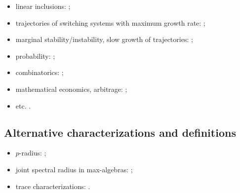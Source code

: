 \documentclass[a4paper,fleqn]{article}
\let\cite=\citep
\begin{document}
\begin{itemize}
{      Koz:INFOPROC16:e, LJP:HSCC16, LPG:SIAM20, LRG:ArXiv26,
      LRG:Automatica26, MonMarg:AJIFAC11, PEDJ:Autom16, PhilJung:ECC15,
      Prot:AJIFAC19, OgurJung:CDC14, OgurMart:LAA13, OgurMart:CDC13,
      OgurMart:ECC13, OPJ:SCL16, Reber:PhD19, ReberWebb:Nonlin20,
      SafKhan:IEEETAC17, Sheipak:MZ98, ShenHu:SIAMJCO12, SWMWK:SIAMREV07,
      Tuna:AJIFAC08, TW:CDC12, WangYu:14, WangJu:IEEECSL21, WRDV:CDC14,
      WRDV:IEEETAC16, ZhangXu:ArXiv20};
  \item linear inclusions: \cite{ABMW:MTNS12, AJPR:IFACSRCD12, Bar:AIT88-3:e,
      Bar:AIT88-2:e, Bar:AIT88-5:e, Bar:ACC95, BarVin:LAA11, CheMam:BASRM04,
      DaiOp:AIT01:e, DHHX:JFI17, GurSam:CDC05, Gurv:LAA95, VEB:LAA00,
      Wirth:IJRNC98};
  \item trajectories of switching systems with maximum growth rate:
    \cite{ACDDHK:STACS15, AGM:ArXiv24, AGMM:CDC25, BCH:SF16, GCM:CDC13,
      CGM:JDE15, GS:CDC17, HSZ:IEEETAC09, Koz:CDC05:e, Koz:Automatica22,
      Koz:WIAS05, Koz:INFOPROC06:e, LJP:HSCC16, MonMarg:AJIFAC11,
      Morris:SIAMJCO24:2, ShenHu:SIAMJCO12, WuHe:SIAMJCO20};
  \item marginal stability/instability, slow growth of trajectories:
    \cite{CMS:SCL12, Morris:SCL22, Morris:SIAMJCO24:2, MorVar:DS23,
      Sun:IEEETAC08, PhilJung:ICHS15, PJ:NAHS15, Prot:SCL16, Varney21,
      VarMor:LAA25};
  \item probability: \cite{ADFP:93, AltPar:CDC19, AltPar:SIAMJCO20,
      DHH:ArXiv14, KKV:CESA98, KM:ArXiv25, Li:IEEETAC11, Sert:Thesis16,
      Sert:CRMASP17};
  \item combinatorics: \cite{BJ:CANT10, JPB:TCM09, MOS:GTS99, MOS:IEEETIT01,
      MOS:LAA07, Prot:SM00};
  \item mathematical economics, arbitrage: \cite{CrossKPP:MECA12,
      CrossKoz:DCDSB13, KozCalPok:ArXiv10};
  \item etc. \cite{ABMW:DCDSB14, BCK:AIP16, DGT:ArXiv25, JPB:LNCS08, KZW:AM26,
      NP:SIAMJMAA20, Oreg-Reyes:GGD18, TO:ArXiv09, VladRub:JCA01}.
\end{itemize}

\subsection*{Alternative characterizations and definitions}
\begin{itemize}
  \item $p$-radius: \cite{BhaBha:SM95, JP:CDC10, JunProt:SIAMJSC11,
      Morris:SIAMJMAA22, OgurJung:CDC14, OgurMart:LAA14, OPJ:SCL16,
      Prot:LAA08, Prot:CDC05:2, Muller:APM97, Morris:AM16};
  \item joint spectral radius in max-algebras: \cite{AS:ArXiv26, Bapat:LAA98,
      BGT:IEEETAC00, DGM:LIPICS17, Gaubert:IEEETAC95, GMW:LAA17,
      GurMas:LAA11, Lur:LAA05, Lur:LAA06:1, LurYang:LAA09, MulPep:LAA13,
      Pep:LAA08, Pep:LAA11};
  \item trace characterizations: \cite{ChenZhou:LAA00, Xu:EJLA10}.
\end{itemize}
\end{document}
